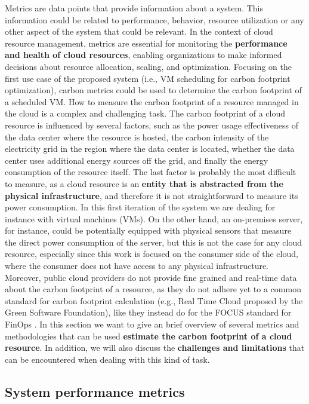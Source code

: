 Metrics are data points that provide information about a system.
This information could be related to performance, behavior, resource utilization or any other aspect of the system that could be relevant.
In the context of cloud resource management, metrics are essential for monitoring the \textbf{performance and health of cloud resources}, enabling organizations to make informed decisions about resource allocation, scaling, and optimization.
Focusing on the first use case of the proposed system (i.e., VM scheduling for carbon footprint optimization), carbon metrics could be used to determine the carbon footprint of a scheduled VM.
How to measure the carbon footprint of a resource managed in the cloud is a complex and challenging task.
The carbon footprint of a cloud resource is influenced by several factors, such as the power usage effectiveness of the data center where the resource is hosted, the carbon intensity of the electricity grid in the region where the data center is located, whether the data center uses additional energy sources off the grid, and finally the energy consumption of the resource itself.
The last factor is probably the most difficult to measure, as a cloud resource is an \textbf{entity that is abstracted from the physical infrastructure}, and therefore it is not straightforward to measure its power consumption. 
In this first iteration of the system we are dealing for instance with virtual machines (VMs).
On the other hand, an on-premises server, for instance, could be potentially equipped with physical sensors that measure the direct power consumption of the server, but this is not the case for any cloud resource, especially since this work is focused on the consumer side of the cloud, where the consumer does not have access to any physical infrastructure.
Moreover, public cloud providers do not provide fine grained and real-time data about the carbon footprint of a resource, as they do not adhere yet to a common standard for carbon footprint calculation (e.g., Real Time Cloud proposed by the Green Software Foundation), like they instead do for the FOCUS standard for FinOps \cite{finops_focus_spec}.
In this section we want to give an brief overview of several metrics and methodologies that can be used \textbf{estimate the carbon footprint of a cloud resource}.
In addition, we will also discuss the \textbf{challenges and limitations} that can be encountered when dealing with this kind of task.

\subsection{System performance metrics}

